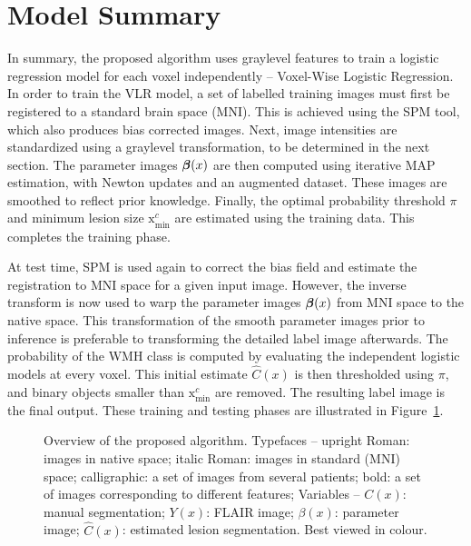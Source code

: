 \section{Model Summary}
In summary, the proposed algorithm uses graylevel features
to train a logistic regression model for each voxel independently -- Voxel-Wise Logistic Regression.
In order to train the VLR model,
a set of labelled training images must first be registered to a standard brain space (MNI).
This is achieved using the SPM  tool, which also produces bias corrected images.
Next, image intensities are standardized using a graylevel transformation,
to be determined in the next section.
The parameter images $\bm{\beta}(x)$ are then computed using iterative MAP estimation,
with Newton updates and an augmented dataset.
These images are smoothed to reflect prior knowledge.
Finally, the optimal probability threshold $\pi$
and minimum lesion size $\mathrm{x}_{\min}^{c}$
are estimated using the training data.
This completes the training phase.
\par
At test time, SPM  is used again to
correct the bias field and estimate the registration to MNI space for a given input image.
However, the inverse transform is now used to warp the parameter images $\bm{\beta}(x)$
from MNI space to the native space.
This transformation of the smooth parameter images prior to inference is preferable
to transforming the detailed label image afterwards.
The probability of the WMH class is computed
by evaluating the independent logistic models at every voxel.
This initial estimate $\hat{C}(x)$ is then thresholded using $\pi$,
and binary objects smaller than $\mathrm{x}_{\min}^{c}$ are removed.
The resulting label image is the final output.
These training and testing phases are illustrated in Figure~\ref{fig:modelsum}.
\begin{figure}
  \centering\scalebox{0.65}{}
  \caption{Overview of the proposed algorithm.
    Typefaces --
    upright Roman: images in native space;
    italic Roman: images in standard (MNI) space;
    calligraphic: a set of images from several patients;
    bold: a set of images corresponding to different features;
    Variables --
    $C(x)$: manual segmentation;
    $Y(x)$: FLAIR image;
    $\beta(x)$: parameter image;
    $\hat{C}(x)$: estimated lesion segmentation.
    Best viewed in colour.}%
  \label{fig:modelsum}
\end{figure}
